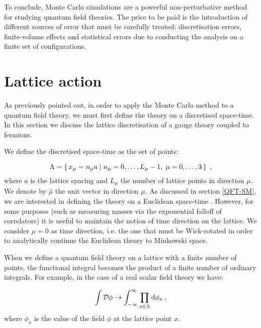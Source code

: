 To conclude, Monte Carlo simulations are a powerful non-perturbative method for studying quantum field theories. The price to be paid is the introduction of different sources of error that must be carefully treated: discretisation errors, finite-volume effects and statistical errors due to conducting the analysis on a finite set of configurations. 





\section{Lattice action}
\label{Lattice_action}

As previously pointed out, in order to apply the Monte Carlo method to a quantum field theory, we must first define the theory on a discretised space-time. In this section we discuss the lattice discretisation of a gauge theory coupled to fermions.

We define the discretised space-time as the set of points:

\begin{equation}
\Lambda = \set{x_{\mu} = n_{\mu} a  \mid  n_{\mu} = 0, \dots, L_{\mu} -1, \; \mu = 0, \dots, 3 } \; ,
\end{equation}
%
where $a$ is the lattice spacing and $L_{ \mu}$ the number of lattice points in direction $\mu$. We denote by $\hat \mu$ the unit vector in direction $\mu$. As discussed in section \ref{QFT-SM}, we are interested in defining the theory on a Euclidean space-time . However, for some purposes (such as measuring masses via the exponential falloff of correlators) it is useful to maintain the notion of time direction on the lattice. We consider $\mu = 0$ as time direction, i.e. the one that must be Wick-rotated in order to analytically continue the Euclidean theory to Minkowski space.

When we define a quantum field theory on a lattice with a finite number of points, the functional integral becomes the product of a finite number of ordinary integrals. For example, in the case of a real scalar field theory we have:

\begin{equation}
\int \mathcal D \phi \to \int_{-\infty}^{\infty} \prod_{x \in \Lambda} \mathrm{d} \phi_x \: ,
\end{equation}
%
where $\phi_x$ is the value of the field $\phi$ at the lattice point $x$.

